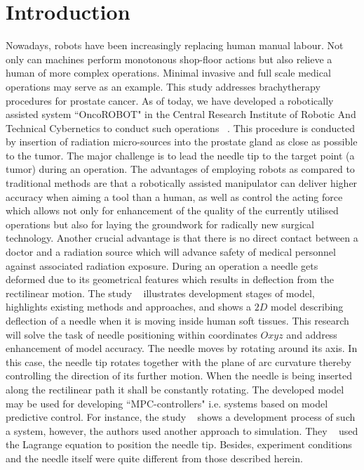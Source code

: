 \documentclass[a4paper]{jpconf}
\begin{document}
\section{Introduction}
Nowadays, robots have been increasingly replacing human manual labour. Not only can machines perform monotonous shop-floor actions but also relieve a human of more complex operations. Minimal invasive and full scale medical operations may serve as an example. This study addresses brachytherapy procedures for prostate cancer. As of today, we have developed a robotically assisted system ``OncoROBOT" in the Central Research Institute of Robotic And Technical Cybernetics to conduct such operations ~\cite{one, two}. This procedure is conducted by insertion of radiation micro-sources into the prostate gland as close as possible to the tumor.  The major challenge is to lead the needle tip to the target point (a tumor) during an operation. The advantages of employing robots as compared to traditional methods are that a robotically assisted manipulator can deliver higher accuracy when aiming a tool than a human, as well as control the acting force which allows not only for enhancement of the quality of the currently utilised operations but also for laying the groundwork for radically new surgical technology. Another crucial advantage is that there is no direct contact between a doctor and a radiation source which will advance safety of medical personnel against associated radiation exposure. During an operation a needle gets deformed due to its geometrical features which results in deflection from the rectilinear motion. The study ~\cite{Model} illustrates development stages  of model, highlights existing methods and approaches, and shows a $2D$ model describing deflection of a needle when it is moving inside human soft tissues. This research will solve the task of needle positioning within coordinates $Oxyz$ and address enhancement of model accuracy. The needle moves by rotating around its axis. In this case, the needle tip rotates together with the plane of arc curvature thereby controlling the direction of its further motion. When the needle is being inserted along the rectilinear path it shall be constantly rotating. The developed model may be used for developing ``MPC-controllers" i.e. systems based on model predictive control. For instance, the study ~\cite{four} shows a development process of such a system, however, the authors used another approach to simulation. They ~\cite{four} used the Lagrange equation to position the needle tip. Besides, experiment conditions and the needle itself were quite different from those described herein.
\end{document}
